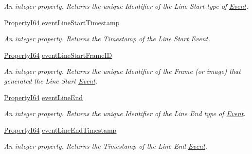 \begin{DoxyCompactItemize}
\begin{DoxyCompactList}\small\item\em An integer property. Returns the unique Identifier of the Line Start type of \hyperlink{classmv_i_m_p_a_c_t_1_1acquire_1_1_event}{Event}. \end{DoxyCompactList}\item 
\hyperlink{group___common_interface_ga81749b2696755513663492664a18a893}{Property\+I64} \hyperlink{classmv_i_m_p_a_c_t_1_1acquire_1_1_gen_i_cam_1_1_event_control_a24b40434f62e07299e34d3cab39d8ea5}{event\+Line\+Start\+Timestamp}
\begin{DoxyCompactList}\small\item\em An integer property. Returns the Timestamp of the Line Start \hyperlink{classmv_i_m_p_a_c_t_1_1acquire_1_1_event}{Event}. \end{DoxyCompactList}\item 
\hyperlink{group___common_interface_ga81749b2696755513663492664a18a893}{Property\+I64} \hyperlink{classmv_i_m_p_a_c_t_1_1acquire_1_1_gen_i_cam_1_1_event_control_a4362398097db9c150ffc80d189675ca1}{event\+Line\+Start\+Frame\+I\+D}
\begin{DoxyCompactList}\small\item\em An integer property. Returns the unique Identifier of the Frame (or image) that generated the Line Start \hyperlink{classmv_i_m_p_a_c_t_1_1acquire_1_1_event}{Event}. \end{DoxyCompactList}\item 
\hyperlink{group___common_interface_ga81749b2696755513663492664a18a893}{Property\+I64} \hyperlink{classmv_i_m_p_a_c_t_1_1acquire_1_1_gen_i_cam_1_1_event_control_ac5d881c32b4b809d1082414467c9af1f}{event\+Line\+End}
\begin{DoxyCompactList}\small\item\em An integer property. Returns the unique Identifier of the Line End type of \hyperlink{classmv_i_m_p_a_c_t_1_1acquire_1_1_event}{Event}. \end{DoxyCompactList}\item 
\hyperlink{group___common_interface_ga81749b2696755513663492664a18a893}{Property\+I64} \hyperlink{classmv_i_m_p_a_c_t_1_1acquire_1_1_gen_i_cam_1_1_event_control_a513f0e4e25a80a0576a1334c139f758b}{event\+Line\+End\+Timestamp}
\begin{DoxyCompactList}\small\item\em An integer property. Returns the Timestamp of the Line End \hyperlink{classmv_i_m_p_a_c_t_1_1acquire_1_1_event}{Event}. \end{DoxyCompactList}\item 

\end{DoxyCompactItemize}
